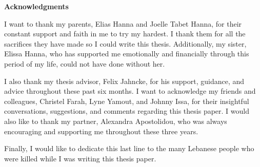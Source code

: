\clearemptydoublepage
{}
{}

\vspace*{2cm}

\begin{center}
{\Large \textbf{Acknowledgments}}
\vspace{1cm}
\end{center}

\begin{center}
I want to thank my parents, Elias Hanna and Joelle Tabet Hanna, for their constant support and faith in me to try my hardest.
I thank them for all the sacrifices they have made so I could write this thesis. Additionally, my sister, Elissa Hanna,
who has supported me emotionally and financially through this period of my life, could not have done without her.
\vspace{0.5cm}

I also thank my thesis advisor, Felix Jahncke, for his support, guidance, and advice throughout these past six months.
I want to acknowledge my friends and colleagues, Christel Farah, Lyne Yamout, and Johnny Issa, for their insightful conversations, suggestions, and comments regarding
this thesis paper. I would also like to thank my partner, Alexandra Apostolidou, who was always encouraging and supporting me throughout these three years.
\vspace{0.5cm}

Finally, I would like to dedicate this last line to the many Lebanese people who were killed while I was writing this thesis paper.
\end{center}
